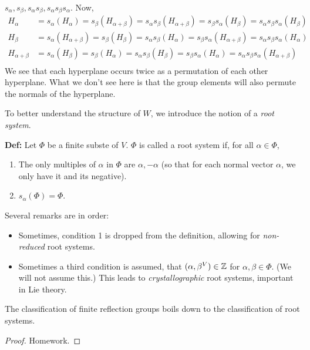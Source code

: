 $s_\alpha, s_\beta, s_\alpha s_\beta, s_\alpha s_\beta s_\alpha$. Now,
\begin{align*}
    H_\alpha
    &= s_\alpha(H_\alpha)
    = s_\beta (H_{\alpha+\beta})
    = s_\alpha s_\beta(H_{\alpha+\beta})
    = s_\beta s_\alpha (H_\beta)
    = s_\alpha s_\beta s_\alpha (H_\beta) \\
    H_\beta
    &= s_\alpha(H_{\alpha+\beta})
    = s_\beta (H_{\beta})
    = s_\alpha s_\beta(H_\alpha)
    = s_\beta s_\alpha (H_{\alpha+\beta})
    = s_\alpha s_\beta s_\alpha (H_{\alpha}) \\
    H_{\alpha+\beta}
    &= s_\alpha(H_{\beta})
    = s_\beta (H_{\alpha})
    = s_\alpha s_\beta(H_\beta)
    = s_\beta s_\alpha (H_{\alpha})
    = s_\alpha s_\beta s_\alpha (H_{\alpha+\beta}) \\
\end{align*}
We see that each hyperplane occurs twice as a permutation of each other
hyperplane. What we don't see here is that the group elements will also permute
the normals of the hyperplane.

To better understand the structure of $W$, we introduce the notion of a
{\em root system}.

{\bf Def:} Let $\Phi$ be a finite subste of $V$. $\Phi$ is called a root system
if, for all $\alpha \in \Phi$,
\begin{enumerate}
\item The only multiples of $\alpha$ in $\Phi$ are
$\alpha, -\alpha$ (so that for each normal vector $\alpha$, we only have it
and its negative).
\item $s_\alpha(\Phi) = \Phi$.
\end{enumerate}
Several remarks are in order:
\begin{itemize}
\item Sometimes, condition 1 is dropped from the definition, allowing for
{\em non-reduced} root systems.
\item Sometimes a third condition is assumed, that $(\alpha, \beta^V) \in \mathbb{Z}$
for $\alpha, \beta \in \Phi$. (We will not assume this.)
This leads to {\em crystallographic} root systems, important in Lie theory.
\end{itemize}

\begin{lemma}
The classification of finite reflection groups boils down to the classification
of root systems.
\end{lemma}

\begin{proof}
Homework.
\end{proof}
